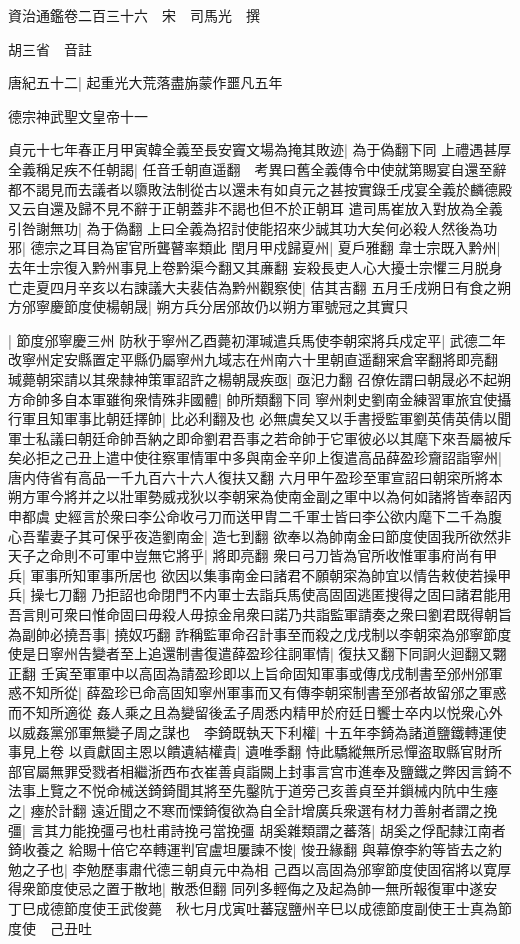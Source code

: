 資治通鑑卷二百三十六　宋　司馬光　撰

胡三省　音註

唐紀五十二|{
	起重光大荒落盡旃蒙作噩凡五年}


德宗神武聖文皇帝十一

貞元十七年春正月甲寅韓全義至長安竇文場為掩其敗迹|{
	為于偽翻下同}
上禮遇甚厚全義稱足疾不任朝謁|{
	任音壬朝直遥翻　考異曰舊全義傳令中使就第賜宴自還至辭都不謁見而去議者以隳敗法制從古以還未有如貞元之甚按實錄壬戌宴全義於麟德殿又云自還及歸不見不辭于正朝蓋非不謁也但不於正朝耳}
遣司馬崔放入對放為全義引咎謝無功|{
	為于偽翻}
上曰全義為招討使能招來少誠其功大矣何必殺人然後為功邪|{
	德宗之耳目為宦官所聾瞽率類此}
閏月甲戍歸夏州|{
	夏戶雅翻}
韋士宗既入黔州|{
	去年士宗復入黔州事見上卷黔渠今翻又其亷翻}
妄殺長吏人心大擾士宗懼三月脱身亡走夏四月辛亥以右諫議大夫裴佶為黔州觀察使|{
	佶其吉翻}
五月壬戌朔日有食之朔方邠寧慶節度使楊朝晟|{
	朔方兵分居邠故仍以朔方軍號冠之其實只}


|{
	節度邠寧慶三州}
防秋于寧州乙酉薨初渾瑊遣兵馬使李朝寀將兵戍定平|{
	武德二年改寧州定安縣置定平縣仍屬寧州九域志在州南六十里朝直遥翻宷倉宰翻將即亮翻}
瑊薨朝寀請以其衆隸神策軍詔許之楊朝晟疾亟|{
	亟汜力翻}
召僚佐謂曰朝晟必不起朔方命帥多自本軍雖徇衆情殊非國體|{
	帥所類翻下同}
寧州刺史劉南金練習軍旅宜使攝行軍且知軍事比朝廷擇帥|{
	比必利翻及也}
必無虞矣又以手書授監軍劉英倩英倩以聞軍士私議曰朝廷命帥吾納之即命劉君吾事之若命帥于它軍彼必以其麾下來吾屬被斥矣必拒之己丑上遣中使往察軍情軍中多與南金辛卯上復遣高品薛盈珍齎詔詣寧州|{
	唐内侍省有高品一千九百六十六人復扶又翻}
六月甲午盈珍至軍宣詔曰朝寀所將本朔方軍今將并之以壯軍勢威戎狄以李朝宷為使南金副之軍中以為何如諸將皆奉詔丙申都虞史經言於衆曰李公命收弓刀而送甲胄二千軍士皆曰李公欲内麾下二千為腹心吾輩妻子其可保乎夜造劉南金|{
	造七到翻}
欲奉以為帥南金曰節度使固我所欲然非天子之命則不可軍中豈無它將乎|{
	將即亮翻}
衆曰弓刀皆為官所收惟軍事府尚有甲兵|{
	軍事所知軍事所居也}
欲因以集事南金曰諸君不願朝寀為帥宜以情告敕使若操甲兵|{
	操七刀翻}
乃拒詔也命閉門不内軍士去詣兵馬使高固固逃匿搜得之固曰諸君能用吾言則可衆曰惟命固曰毋殺人毋掠金帛衆曰諾乃共詣監軍請奏之衆曰劉君既得朝旨為副帥必撓吾事|{
	撓奴巧翻}
詐稱監軍命召計事至而殺之戊戌制以李朝寀為邠寧節度使是日寧州告變者至上追還制書復遣薛盈珍往詗軍情|{
	復扶又翻下同詗火迴翻又翾正翻}
壬寅至軍軍中以高固為請盈珍即以上旨命固知軍事或傳戊戌制書至邠州邠軍惑不知所從|{
	薛盈珍已命高固知寧州軍事而又有傳李朝寀制書至邠者故留邠之軍惑而不知所適從}
姦人乘之且為變留後孟子周悉内精甲於府廷日饗士卒内以悦衆心外以威姦黨邠軍無變子周之謀也　李錡既執天下利權|{
	十五年李錡為諸道鹽鐵轉運使事見上卷}
以貢獻固主恩以饋遺結權貴|{
	遺唯季翻}
恃此驕縱無所忌憚盗取縣官財所部官屬無罪受戮者相繼浙西布衣崔善貞詣闕上封事言宫市進奉及鹽鐵之弊因言錡不法事上覽之不悦命械送錡錡聞其將至先鑿阬于道旁己亥善貞至并鎻械内阬中生瘞之|{
	瘞於計翻}
遠近聞之不寒而慄錡復欲為自全計增廣兵衆選有材力善射者謂之挽彊|{
	言其力能挽彊弓也杜甫詩挽弓當挽彊}
胡奚雜類謂之蕃落|{
	胡奚之俘配隸江南者錡收養之}
給賜十倍它卒轉運判官盧坦屢諫不悛|{
	悛丑緣翻}
與幕僚李約等皆去之約勉之子也|{
	李勉歷事肅代德三朝貞元中為相}
己酉以高固為邠寧節度使固宿將以寛厚得衆節度使忌之置于散地|{
	散悉但翻}
同列多輕侮之及起為帥一無所報復軍中遂安　丁巳成德節度使王武俊薨　秋七月戊寅吐蕃寇鹽州辛巳以成德節度副使王士真為節度使　己丑吐

